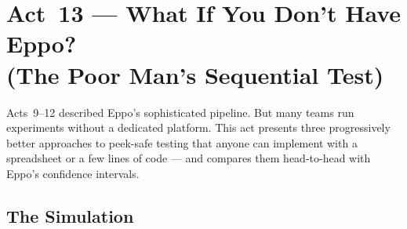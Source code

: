 \documentclass[12pt, a4paper]{article}
\begin{document}
\newpage
\section{Act~13 --- What If You Don't Have Eppo?\\
         (The Poor Man's Sequential Test)}

Acts~9--12 described Eppo's sophisticated pipeline.  But many teams run
experiments without a dedicated platform.  This act presents three
progressively better approaches to peek-safe testing that anyone can implement
with a spreadsheet or a few lines of code --- and compares them head-to-head
with Eppo's confidence intervals.

\subsection{The Simulation}
\end{document}
